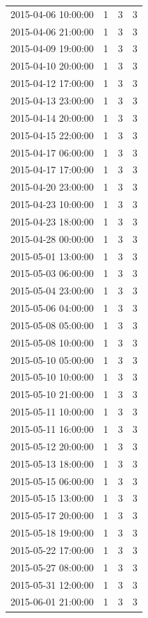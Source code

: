 \begin{tabular}{lrrr}
2015-04-06 10:00:00 & 1 & 3 & 3 \\
2015-04-06 21:00:00 & 1 & 3 & 3 \\
2015-04-09 19:00:00 & 1 & 3 & 3 \\
2015-04-10 20:00:00 & 1 & 3 & 3 \\
2015-04-12 17:00:00 & 1 & 3 & 3 \\
2015-04-13 23:00:00 & 1 & 3 & 3 \\
2015-04-14 20:00:00 & 1 & 3 & 3 \\
2015-04-15 22:00:00 & 1 & 3 & 3 \\
2015-04-17 06:00:00 & 1 & 3 & 3 \\
2015-04-17 17:00:00 & 1 & 3 & 3 \\
2015-04-20 23:00:00 & 1 & 3 & 3 \\
2015-04-23 10:00:00 & 1 & 3 & 3 \\
2015-04-23 18:00:00 & 1 & 3 & 3 \\
2015-04-28 00:00:00 & 1 & 3 & 3 \\
2015-05-01 13:00:00 & 1 & 3 & 3 \\
2015-05-03 06:00:00 & 1 & 3 & 3 \\
2015-05-04 23:00:00 & 1 & 3 & 3 \\
2015-05-06 04:00:00 & 1 & 3 & 3 \\
2015-05-08 05:00:00 & 1 & 3 & 3 \\
2015-05-08 10:00:00 & 1 & 3 & 3 \\
2015-05-10 05:00:00 & 1 & 3 & 3 \\
2015-05-10 10:00:00 & 1 & 3 & 3 \\
2015-05-10 21:00:00 & 1 & 3 & 3 \\
2015-05-11 10:00:00 & 1 & 3 & 3 \\
2015-05-11 16:00:00 & 1 & 3 & 3 \\
2015-05-12 20:00:00 & 1 & 3 & 3 \\
2015-05-13 18:00:00 & 1 & 3 & 3 \\
2015-05-15 06:00:00 & 1 & 3 & 3 \\
2015-05-15 13:00:00 & 1 & 3 & 3 \\
2015-05-17 20:00:00 & 1 & 3 & 3 \\
2015-05-18 19:00:00 & 1 & 3 & 3 \\
2015-05-22 17:00:00 & 1 & 3 & 3 \\
2015-05-27 08:00:00 & 1 & 3 & 3 \\
2015-05-31 12:00:00 & 1 & 3 & 3 \\
2015-06-01 21:00:00 & 1 & 3 & 3 \\

\end{tabular}

